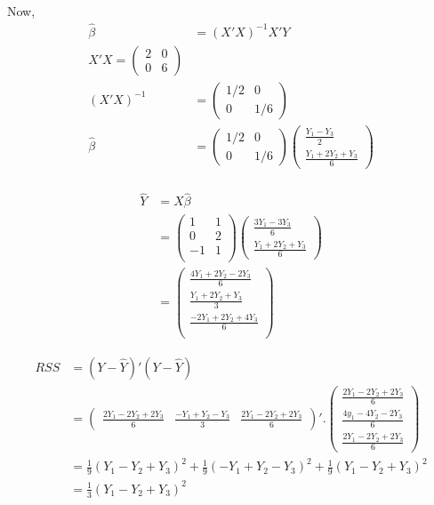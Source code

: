 \documentclass[a4paper]{article}
\begin{document}
Now,
\begin{align*}
\hat{\beta} &= (X'X)^{-1}X'Y\\
X'X = \begin{pmatrix} 2 & 0\\
0 & 6
\end{pmatrix}\\
(X'X)^{-1} &= \begin{pmatrix} 1/2 & 0\\
0 & 1/6
\end{pmatrix}\\
\hat{\beta} &= \begin{pmatrix} 1/2 & 0\\ 0 & 1/6 \end{pmatrix}\begin{pmatrix}\frac{Y_1-Y_3}{2}\\
\frac{Y_1+2Y_2+Y_3}{6}
\end{pmatrix}\\
\end{align*}

\begin{align*}
\hat{Y} &= X\hat{\beta}\\
&= \begin{pmatrix}
1 & 1 \\
0 & 2 \\
-1 & 1\\
\end{pmatrix}\begin{pmatrix}\frac{3Y_1-3Y_3}{6}\\
\frac{Y_1+2Y_2+Y_3}{6}
\end{pmatrix}\\
&= \begin{pmatrix}
\frac{4Y_1+2Y_2-2Y_3}{6}\\
\frac{Y_1+2Y_2+Y_3}{3}\\
\frac{-2Y_1+2Y_2+4Y_3}{6}\\
\end{pmatrix}
\end{align*}

\begin{align*}
RSS &= (Y-\hat{Y})'(Y-\hat{Y})\\
&= \begin{pmatrix}\frac{2Y_1-2Y_2+2Y_3}{6} &
\frac{-Y_1+Y_2-Y_3}{3} & \frac{2Y_1-2Y_2+2Y_3}{6}
\end{pmatrix}'.\begin{pmatrix}\frac{2Y_1-2Y_2+2Y_3}{6} \\
\frac{4y_1-4Y_2-2Y_3}{6} \\ \frac{2Y_1-2Y_2+2Y_3}{6}
\end{pmatrix}\\
&= \frac{1}{9}(Y_1-Y_2+Y_3)^2 + \frac{1}{9}(-Y_1+Y_2-Y_3)^2 + \frac{1}{9}(Y_1-Y_2+Y_3)^2\\
&= \frac{1}{3}(Y_1-Y_2+Y_3)^2
\end{align*}
\end{document}
